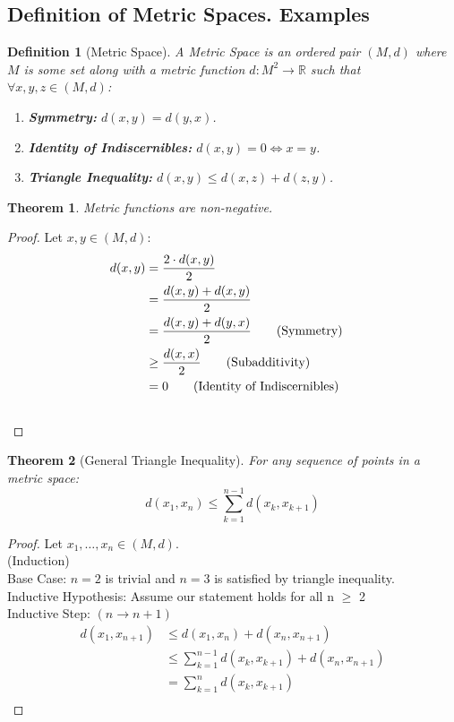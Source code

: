 \documentclass{article}
\newtheorem{definition}{Definition}[section]
\newtheorem{theorem}{Theorem}[section]
\begin{document}
		\subsection{Definition of Metric Spaces. Examples}
			
			\begin{definition}[Metric Space]
				A Metric Space is an ordered pair $(M, d)$ where $M$ is some set along with a metric function $d \colon M^2 \to \mathbb{R}$ such that $\forall x, y, z \in (M, d)$:
				\begin{enumerate}
					\item \textbf{Symmetry:} $d(x, y) = d(y, x)$.
					\item \textbf{Identity of Indiscernibles:} $d(x, y) = 0 \Leftrightarrow x=y$.
					\item \textbf{Triangle Inequality:} $d(x, y) \leq d(x, z) + d(z, y)$.
				\end{enumerate}
			\end{definition}
		
			\begin{theorem}
				Metric functions are non-negative.
			\end{theorem}
			\begin{proof}
				Let $x, y \in (M, d)$:
				\begin{align*}
					d(x, y) &= \dfrac{2 \cdot d(x, y)}{2}\\
					&= \dfrac{d(x, y) + d(x, y)}{2}\\
					&= \dfrac{d(x, y) + d(y, x)}{2} \tag{Symmetry}\\
					&\geq \dfrac{d(x, x)}{2} \tag{Subadditivity}\\
					&= 0 \tag{Identity of Indiscernibles} \\ &&\qedhere
				\end{align*}
			\end{proof}

			\begin{theorem}[General Triangle Inequality]
			\label{general triangle inequality}
				For any sequence of points in a metric space:
				$$d(x_1,x_n) \leq \sum\limits_{k=1}^{n-1} d(x_k,x_{k+1})$$
			\end{theorem}
			\begin{proof}
				Let $x_1,\ldots,x_n \in (M, d)$. \\
				(Induction)\\
				Base Case: $n=2$ is trivial and $n=3$ is satisfied by triangle inequality.\\
				Inductive Hypothesis: Assume our statement holds for all n $\geq$ 2\\
				Inductive Step: $\left(n \longrightarrow n+1\right)$
				\begin{align*}
					d(x_1,x_{n+1}) &\leq d(x_1,x_n) + d(x_n,x_{n+1})\\
					&\leq \sum\limits_{k=1}^{n-1} d(x_k,x_{k+1}) + d(x_n,x_{n+1})\\
					&= \sum\limits_{k=1}^{n} d(x_k,x_{k+1})\\
				\end{align*}
			\end{proof}
\end{document}
